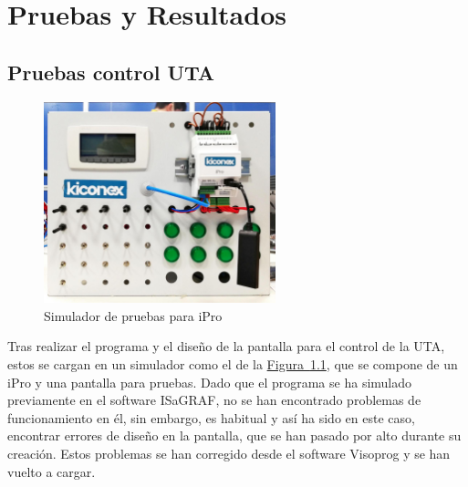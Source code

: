 
\cleardoublepage
\chapter{Pruebas y Resultados}

\label{chap:resultados} %


\section{Pruebas control UTA}
\label{sec:pruebasUTA}

\begin{figure}[H]
  \centering
  \includegraphics[width=0.6\textwidth, keepaspectratio]{img/simuladorIpro}
  \caption{Simulador de pruebas para iPro}
  \label{figura:simulador}
\end{figure}

Tras realizar el programa y el diseño de la pantalla para el control de la UTA, estos se cargan en un simulador como el de la \hyperref[figura:simulador]{Figura~\ref{figura:simulador}}, que se compone de un iPro y una pantalla para pruebas. Dado que el programa se ha simulado previamente en el software ISaGRAF, no se han encontrado problemas de funcionamiento en él, sin embargo, es habitual y así ha sido en este caso, encontrar errores de diseño en la pantalla, que se han pasado por alto durante su creación. Estos problemas se han corregido desde el software Visoprog y se han vuelto a cargar.

